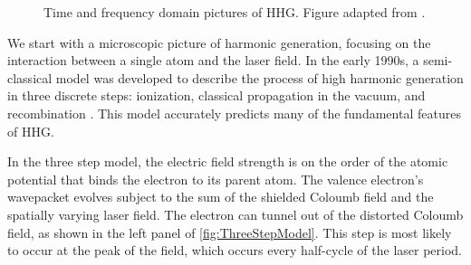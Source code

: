 \begin{figure}
	\centering
	\qquad
	\caption{Time and frequency domain pictures of HHG. Figure adapted from \cite{eichTimeAngleresolvedPhotoemission2014}.}
	\label{fig:APT_IR_field}
\end{figure}

We start with a microscopic picture of harmonic generation, focusing on the interaction between a single atom and the laser field. In the early 1990s, a semi-classical model was developed to describe the process of high harmonic generation in three discrete steps: ionization, classical propagation in the vacuum, and recombination \cite{schaferThresholdIonizationHigh1993,corkumPlasmaPerspectiveStrong1993}. This model accurately predicts many of the fundamental features of HHG.

In the three step model, the electric field strength is on the order of the atomic potential that binds the electron to its parent atom. The valence electron's wavepacket evolves subject to the sum of the shielded Coloumb field and the spatially varying laser field. The electron can tunnel out of the distorted Coloumb field, as shown in the left panel of \cref{fig:ThreeStepModel}. This step is most likely to occur at the peak of the field, which occurs every half-cycle of the laser period.

